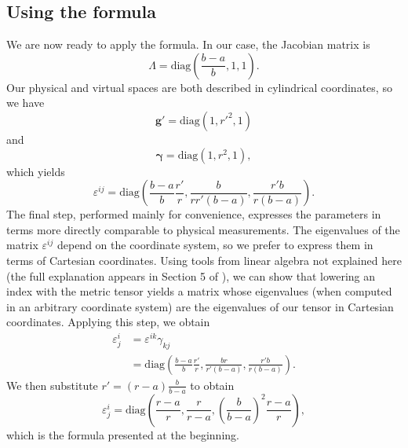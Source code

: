 \subsection{Using the formula}
We are now ready to apply the formula. In our case, the Jacobian matrix is
\[\Lambda=\text{diag}\left( \frac{b-a}{b} ,1,1\right).\]
Our physical and virtual spaces are both described in cylindrical
coordinates, so we have
\[\boldsymbol{g}'=\text{diag}(1,r'^2,1)\]
and
\[\boldsymbol{\gamma}=\text{diag}\left(1,r^2,1\right),\]
which yields
\[
\varepsilon^{ij}=\text{diag}
\left(
\frac{b-a}{b}\frac{r'}{r},
\frac{b}{rr'(b-a)},
\frac{r'b}{r(b-a)}
\right).
\]
The final step, performed mainly for convenience, expresses the parameters in terms more directly comparable to physical measurements.
The eigenvalues of the matrix \(\varepsilon^{ij}\) depend on the
coordinate system, so we prefer to express them in terms of
Cartesian coordinates. Using tools from linear algebra
not explained here (the full explanation appears in
Section 5 of \cite{leonhardtGeometryLightScience2010}), we can show that lowering an index with the metric tensor
yields a matrix whose eigenvalues (when computed in an arbitrary
coordinate system) are the eigenvalues of our tensor in Cartesian coordinates.
Applying this step, we obtain
\begin{align*}
\varepsilon^i_j&=\varepsilon^{ik}\gamma_{kj}\\
&=\text{diag}
\left(
\frac{b-a}{b}\frac{r'}{r},
\frac{br}{r'(b-a)},
\frac{r'b}{r(b-a)}
\right).
\end{align*}
We then substitute \(r'=(r-a)\frac{b}{b-a}\) to obtain
\[
\varepsilon^i_j =\text{diag}
\left(
\frac{r-a}{r},
\frac{r}{r-a},
\left(\frac{b}{b-a}\right)^2\frac{r-a}{r}
\right),
\]
which is the formula presented at the beginning.
